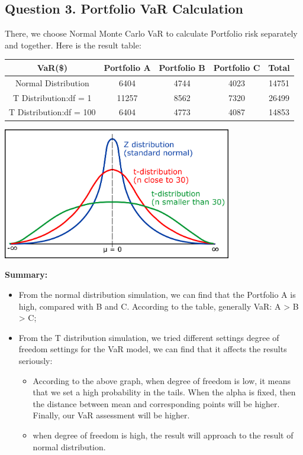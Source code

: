\documentclass[a4paper,12pt]{article}
\begin{document}
\subsection*{Question 3. Portfolio VaR Calculation}
There, we choose Normal Monte Carlo VaR to calculate Portfolio risk separately and together. Here is the result table:\\
\begin{center}
    \begin{tabular}{ c|c|c|c|c}
     \hline
      VaR(\$) & Portfolio A & Portfolio B & Portfolio C & Total\\
     \hline
     Normal Distribution&6404&4744&4023&14751\\
     T Distribution:df = 1&11257&8562&7320&26499\\
     T Distribution:df = 100&6404&4773&4087&14853\\
     \hline
    \end{tabular}
\end{center}
\begin{center}
    \includegraphics[width=10cm]{t_distribution.png}
\end{center}

\textbf{Summary:}
\begin{itemize}
    \item From the normal distribution simulation, we can find that the Portfolio A is high, compared with B and C. According to the table, generally VaR: A > B > C;
    \item From the T distribution simulation, we tried different settings degree of freedom settings for the VaR model, we can find that it affects the results seriously:
    \begin{itemize}
        \item According to the above graph, when degree of freedom is low, it means that we set a high probability in the tails. When the alpha is fixed, then the distance between mean and corresponding points will be higher. Finally, our VaR assessment will be higher.
        \item when degree of freedom is high, the result will approach to the result of normal distribution.
    \end{itemize}
\end{itemize}
\end{document}
